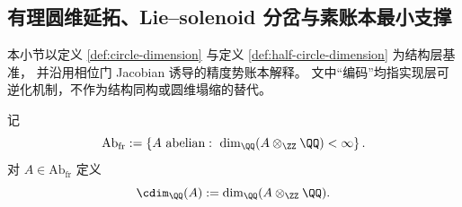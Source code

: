 \subsection{有理圆维延拓、Lie--solenoid 分岔与素账本最小支撑}\label{subsec:conclusion-rational-cdim-solenoid-precision-ledger-rigidity}
本小节以定义 \ref{def:circle-dimension} 与定义 \ref{def:half-circle-dimension} 为结构层基准，
并沿用相位门 Jacobian 诱导的精度势账本解释。
文中“编码”均指实现层可逆化机制，不作为结构同构或圆维塌缩的替代。

\begin{definition}[有限有理秩阿贝尔类与有理圆维]\label{def:conclusion-abfr-cdimq}
记
\[
\mathrm{Ab}_{\mathrm{fr}}
:=
\left\{
A\ \text{abelian}:\ \dim_{\QQ}(A\otimes_{\ZZ}\QQ)<\infty
\right\}.
\]
对 \(A\in\mathrm{Ab}_{\mathrm{fr}}\) 定义
\[
\cdim_{\QQ}(A):=\dim_{\QQ}(A\otimes_{\ZZ}\QQ).
\]
\end{definition}

